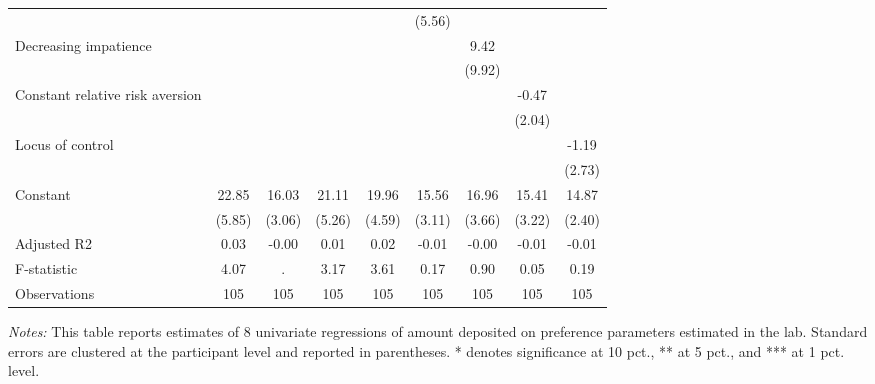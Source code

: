 \begin{table}[htbp]
{\begin{threeparttable}
\begin{tabular}{l*{8}{c}}
                &                  &                  &                  &                  &   (5.56)         &                  &                  &                  \\
Decreasing impatience&                  &                  &                  &                  &                  &     9.42         &                  &                  \\
                &                  &                  &                  &                  &                  &   (9.92)         &                  &                  \\
Constant relative risk aversion&                  &                  &                  &                  &                  &                  &    -0.47         &                  \\
                &                  &                  &                  &                  &                  &                  &   (2.04)         &                  \\
Locus of control&                  &                  &                  &                  &                  &                  &                  &    -1.19         \\
                &                  &                  &                  &                  &                  &                  &                  &   (2.73)         \\
Constant        &    22.85\sym{***}&    16.03\sym{***}&    21.11\sym{***}&    19.96\sym{***}&    15.56\sym{***}&    16.96\sym{***}&    15.41\sym{***}&    14.87\sym{***}\\
                &   (5.85)         &   (3.06)         &   (5.26)         &   (4.59)         &   (3.11)         &   (3.66)         &   (3.22)         &   (2.40)         \\
\midrule
Adjusted R2     &     0.03         &    -0.00         &     0.01         &     0.02         &    -0.01         &    -0.00         &    -0.01         &    -0.01         \\
F-statistic     &     4.07         &        .         &     3.17         &     3.61         &     0.17         &     0.90         &     0.05         &     0.19         \\
Observations    &      105         &      105         &      105         &      105         &      105         &      105         &      105         &      105         \\
\bottomrule \end{tabular} \begin{tablenotes}[flushleft] \footnotesize \item \emph{Notes:} This table reports estimates of 8 univariate regressions of amount deposited on preference parameters estimated in the lab. Standard errors are clustered at the participant level and reported in parentheses. * denotes significance at 10 pct., ** at 5 pct., and *** at 1 pct. level. \end{tablenotes} \end{threeparttable} } \end{table}
